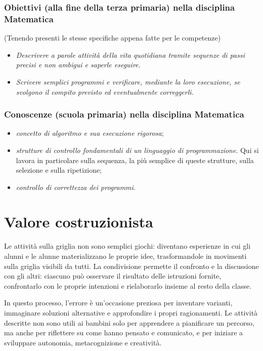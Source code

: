 \subsubsection{Obiettivi (alla fine della terza primaria) nella disciplina Matematica}

(Tenendo presenti le stesse specifiche appena fatte per le competenze)

\begin{itemize}
\item
  \emph{Descrivere a parole attività della vita quotidiana tramite sequenze di passi precisi e non ambigui e saperle eseguire.}
\item
  \emph{Scrivere semplici programmi e verificare, mediante la loro esecuzione, se svolgono il compito previsto ed eventualmente correggerli.}
\end{itemize}

\subsubsection{Conoscenze (scuola primaria) nella disciplina Matematica}


\begin{itemize}
\item
  \textit{concetto di algoritmo e sua esecuzione rigorosa};
\item
  \textit{strutture di controllo fondamentali di un linguaggio di programmazione}. Qui si lavora in particolare sulla sequenza, la più semplice di queste strutture, sulla selezione e sulla ripetizione;
\item
  \textit{controllo di correttezza dei programmi}.
\end{itemize}

\section{Valore costruzionista }\label{valore-costruzionista-1}

Le attività sulla griglia non sono semplici giochi: diventano esperienze in cui gli alunni e le alunne materializzano le proprie idee, trasformandole in movimenti sulla griglia visibili da tutti. La condivisione permette il confronto e la discussione con gli altri: ciascuno può osservare il risultato delle istruzioni fornite, confrontarlo con le proprie intenzioni e rielaborarlo insieme al resto della classe.

In questo processo, l'errore è un'occasione preziosa per inventare varianti, immaginare soluzioni alternative e approfondire i propri ragionamenti. Le attività descritte non sono utili ai bambini solo per apprendere a pianificare un percorso, ma anche per riflettere su come hanno pensato e comunicato, e per iniziare a sviluppare autonomia, metacognizione e creatività.

